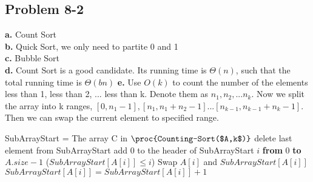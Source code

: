 \documentclass[12pt]{article}
\theoremstyle{definition}
\theoremstyle{remark}
\begin{document}
\subsection*{Problem 8-2}
\textbf{a.} Count Sort\\
\textbf{b.} Quick Sort, we only need to partite 0 and 1\\
\textbf{c.} Bubble Sort\\
\textbf{d.} Count Sort is a good candidate. Its running time is $\Theta(n)$, such that the total running time is $\Theta(bn)$
\textbf{e.} Use $O(k)$ to count the number of the elements less than 1, less than 2, ... less than k. Denote them as $n_1,n_2,...n_k$. Now we split the array into k ranges, $[0,n_1-1],[n_1,n_1+n_2-1]...[n_{k-1},n_{k-1}+n_k-1]$. Then we can swap the current element to specified range.
\begin{codebox}
\li SubArrayStart = The array C in $\proc{Counting-Sort($A,k$)}$
\li delete last element from SubArrayStart
\li add 0 to the header of SubArrayStart
\li \For $i$ \textbf{from} $0$ \textbf{to} $A.size-1$
\li \quad \While($SubArrayStart[A[i]]\le i$)
\li \qquad Swap $A[i]$ and $SubArrayStart[A[i]]$
\li \qquad $SubArrayStart[A[i]]=SubArrayStart[A[i]]+1$
\end{codebox}
\end{document}
